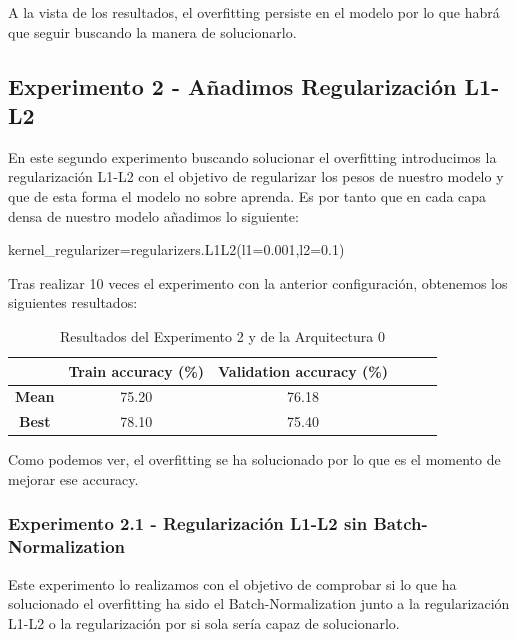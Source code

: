 \documentclass{article}
\begin{document}
		    A la vista de los resultados, el overfitting persiste en el modelo por lo que habr\'a que seguir buscando la manera de solucionarlo.

      \subsection{Experimento 2 - A\~{n}adimos Regularizaci\'on L1-L2}
		\label{j-s-a0-e2} %
			En este segundo experimento buscando solucionar el overfitting introducimos la regularizaci\'on L1-L2 con el objetivo de regularizar los pesos de nuestro modelo y que de esta forma el modelo no sobre aprenda.
            Es por tanto que en cada capa densa de nuestro modelo a\~{n}adimos lo siguiente:
            
            kernel\_regularizer=regularizers.L1L2(l1=0.001,l2=0.1)
			
			
			Tras realizar 10 veces el experimento con la anterior configuraci\'on, obtenemos los siguientes resultados:
			\begin{table}[!h]
				\begin{center}
					\begin{tabular}{ c | c | c | c | c | c |}
						\ & \textbf{Train accuracy (\%)} & \textbf{Validation accuracy (\%)}  \\ \hline
						\textbf{Mean} & 75.20 & 76.18 \\ \hline
						\textbf{Best} & 78.10 & 75.40 \\ \hline
					\end{tabular}
					\caption{Resultados del Experimento 2 y de la Arquitectura 0}
					\label{tab:res-j-a0-e1}
				\end{center}
			\end{table}
		    
		    Como podemos ver, el overfitting se ha solucionado por lo que es el momento de mejorar ese accuracy.
      
      \subsubsection{Experimento 2.1 - Regularizaci\'on L1-L2 sin Batch-Normalization}
		\label{j-s-a0-e2.1} %
			Este experimento lo realizamos con el objetivo de comprobar si lo que ha solucionado el overfitting ha sido el Batch-Normalization junto a la regularizaci\'on L1-L2 o la regularizaci\'on por si sola ser\'ia capaz de solucionarlo.
			
\end{document}
